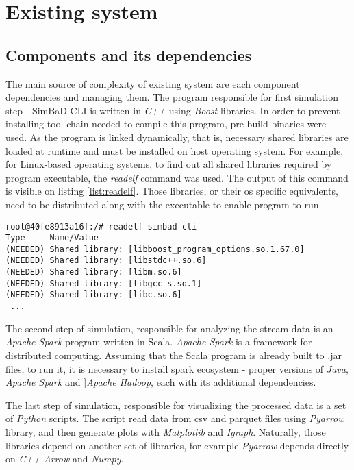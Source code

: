 \chapter{Existing system}
\section{Components and its dependencies}
The main source of complexity of existing system are each component dependencies and managing them. The program responsible for first simulation step - SimBaD-CLI is written in \textit{C++} using \textit{Boost} libraries. In order to prevent installing tool chain needed to compile this program, pre-build binaries were used.  As the program is linked dynamically, that is, necessary shared libraries are loaded at runtime and must be installed on host operating system. For example, for Linux-based operating systems, to find out all shared libraries required by program executable, the \textit{readelf} command was used. The output of this command is visible on listing \ref{list:readelf}. Those libraries, or their os specific equivalents, need to be distributed along with the executable to enable program to run. 
\begin{lstlisting}[label=list:readelf,caption=The output of readelf command (Tag column ommited), basicstyle=\footnotesize\ttfamily]
root@40fe8913a16f:/# readelf simbad-cli 
Type     Name/Value
(NEEDED) Shared library: [libboost_program_options.so.1.67.0]
(NEEDED) Shared library: [libstdc++.so.6]
(NEEDED) Shared library: [libm.so.6]
(NEEDED) Shared library: [libgcc_s.so.1]
(NEEDED) Shared library: [libc.so.6]
 ...
\end{lstlisting}

The second step of simulation, responsible for analyzing the stream data is an \textit{Apache Spark} program written in Scala. \textit{Apache Spark} is a framework for distributed computing. Assuming that the Scala program is already built to .jar files, to run it, it is necessary to install spark ecosystem - proper versions of \textit{Java}, \textit{Apache Spark} and ]\textit{Apache Hadoop}, each with its additional dependencies.

The last step of simulation, responsible for visualizing the processed data is a set of \textit{Python} scripts. The script read data from csv and parquet files using \textit{Pyarrow} library, and then generate plots with \textit{Matplotlib} and \textit{Igraph}. Naturally, those libraries depend on another set of libraries, for example \textit{Pyarrow} depends directly on \textit{C++ Arrow} and \textit{Numpy}. 
\newpage
